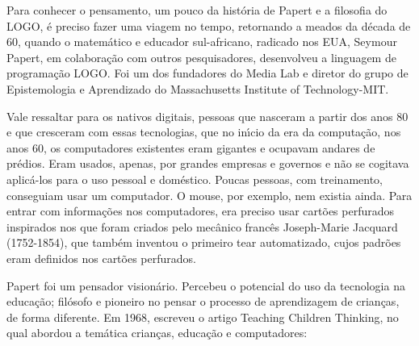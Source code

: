\documentclass[
12pt,		%
openright,	%
twoside,  %
a4paper,			%
chapter=TITLE,		%
english,			%
french,				%
spanish,			%
brazil				%
]{USPSC-classe/USPSC}
\begin{document}
Para conhecer  o pensamento, um pouco da hist\'oria de Papert e  a filosofia do LOGO, \'e preciso fazer uma viagem no tempo, retornando a meados da d\'ecada de 60, quando o matem\'atico e educador sul-africano, radicado nos EUA, Seymour Papert, em colabora\c{c}\~ao com outros pesquisadores, desenvolveu a linguagem  de programa\c{c}\~ao LOGO.  Foi um dos fundadores do Media Lab e diretor do grupo de Epistemologia e Aprendizado do Massachusetts Institute of Technology-MIT.

















Vale ressaltar para os nativos digitais, pessoas que nasceram a partir dos anos 80 e que cresceram com essas tecnologias, que no in\'{\i}cio da era da computa\c{c}\~ao, nos anos 60, os computadores existentes eram gigantes e ocupavam andares de pr\'edios. Eram usados, apenas, por grandes empresas e governos e n\~ao se cogitava aplic\'a-los para o uso pessoal e dom\'estico. Poucas pessoas, com treinamento, conseguiam usar um computador. O mouse, por exemplo, nem existia ainda. Para entrar com informa\c{c}\~oes nos computadores, era preciso usar cart\~oes perfurados inspirados nos que foram criados pelo mec\^anico franc\^es Joseph-Marie Jacquard (1752-1854), que tamb\'em inventou o primeiro tear automatizado, cujos padr\~oes eram definidos nos cart\~oes perfurados.

















Papert foi um pensador vision\'ario. Percebeu o potencial do uso da tecnologia na educa\c{c}\~ao; fil\'osofo e pioneiro no pensar o processo de aprendizagem de crian\c{c}as, de forma diferente. Em 1968, escreveu o artigo \textquotedbl Teaching Children Thinking\textquotedbl , no qual abordou a tem\'atica crian\c{c}as, educa\c{c}\~ao e computadores:
\end{document}
